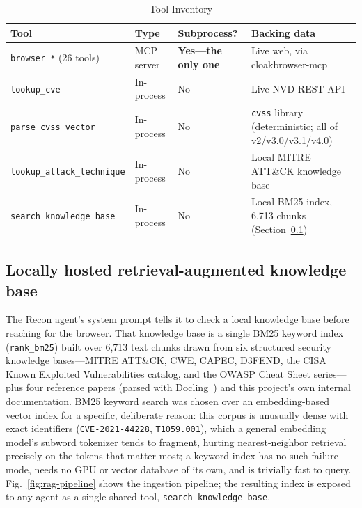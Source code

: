 \documentclass[conference]{IEEEtran}
\begin{document}
\begin{table}[t]
\caption{Tool Inventory}
\label{tab:tools}
\centering
\begin{tabular}{@{}p{2.0cm}p{1.0cm}p{1.7cm}p{2.9cm}@{}}
\toprule
\textbf{Tool} & \textbf{Type} & \textbf{Subprocess?} & \textbf{Backing data} \\
\midrule
\texttt{browser\_*} \newline (26 tools) & MCP server & \textbf{Yes---the only one} & Live web, via cloakbrowser-mcp \\
\texttt{lookup\_cve} & In-process & No & Live NVD REST API \\
\texttt{parse\_\allowbreak cvss\_\allowbreak vector} & In-process & No & \texttt{cvss} library (deterministic; all of v2/v3.0/v3.1/v4.0) \\
\texttt{lookup\_\newline attack\_\newline technique} & In-process & No & Local MITRE ATT\&CK knowledge base \\
\texttt{search\_\newline knowledge\_\newline base} & In-process & No & Local BM25 index, 6{,}713 chunks (Section~\ref{sec:rag}) \\
\bottomrule
\end{tabular}
\end{table}

\subsection{Locally hosted retrieval-augmented knowledge base}
\label{sec:rag}

The Recon agent's system prompt tells it to check a local knowledge base
before reaching for the browser. That knowledge base is a single BM25
keyword index (\texttt{rank\_bm25}) built over 6{,}713 text chunks drawn
from six structured security knowledge bases---MITRE ATT\&CK, CWE, CAPEC,
D3FEND, the CISA Known Exploited Vulnerabilities catalog, and the OWASP
Cheat Sheet series---plus four reference papers (parsed with
Docling~\cite{docling}) and this project's own internal documentation.
BM25 keyword search was chosen over an embedding-based vector index for a
specific, deliberate reason: this corpus is unusually dense with exact
identifiers (\texttt{CVE-2021-44228}, \texttt{T1059.001}), which a general
embedding model's subword tokenizer tends to fragment, hurting nearest-neighbor
retrieval precisely on the tokens that matter most; a keyword index has no
such failure mode, needs no GPU or vector database of its own, and is
trivially fast to query. Fig.~\ref{fig:rag-pipeline} shows the ingestion
pipeline; the resulting index is exposed to any agent as a single shared
tool, \texttt{search\_knowledge\_base}.
\end{document}
